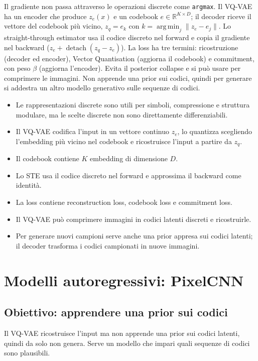 \documentclass[11pt,a4paper]{article}
\newcommand{\R}{\mathbb{R}}
\DeclareMathOperator*{\argmin}{arg\,min}
\begin{document}
\begin{importante}
Il gradiente non passa attraverso le operazioni discrete come \texttt{argmax}. Il VQ-VAE ha un encoder che 
produce $z_e(x)$ e un codebook $e \in \R^{K \times D}$; il decoder riceve il vettore del codebook più 
vicino, $z_q = e_k$ con $k = \argmin_j \|z_e - e_j\|$. Lo straight-through estimator usa il codice discreto nel 
forward e copia il gradiente nel backward ($z_e + \operatorname{detach}(z_q - z_e)$). La loss ha tre termini: 
ricostruzione (decoder ed encoder), Vector Quantisation (aggiorna il codebook) e commitment, con peso $\beta$ (aggiorna l'encoder). 
Evita il posterior collapse e si può usare per comprimere le immagini. Non apprende una prior sui codici, quindi per generare si 
addestra un altro modello generativo sulle sequenze di codici.
\end{importante}

\begin{itemize}
  \item Le rappresentazioni discrete sono utili per simboli,
  compressione e struttura modulare, ma le scelte discrete non
  sono direttamente differenziabili.
  \item Il VQ-VAE codifica l'input in un vettore continuo $z_e$,
  lo quantizza scegliendo l'embedding più vicino nel codebook
  e ricostruisce l'input a partire da $z_q$.
  \item Il codebook contiene $K$ embedding di dimensione $D$.
  \item Lo STE usa il codice discreto nel forward e approssima
  il backward come identità.
  \item La loss contiene reconstruction loss, codebook loss e
  commitment loss.
  \item Il VQ-VAE può comprimere immagini in codici latenti
  discreti e ricostruirle.
  \item Per generare nuovi campioni serve anche una prior appresa
  sui codici latenti; il decoder trasforma i codici campionati
  in nuove immagini.
\end{itemize}

\section{Modelli autoregressivi: PixelCNN}

\subsection{Obiettivo: apprendere una prior sui codici}
Il VQ-VAE ricostruisce l'input ma non apprende una prior sui codici latenti,
quindi da solo non genera. Serve un modello che impari quali sequenze di codici
sono plausibili.
\end{document}

